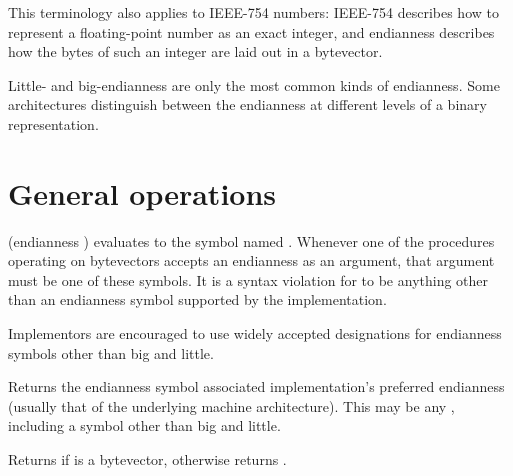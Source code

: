 This terminology also applies to IEEE-754 numbers: IEEE-754 describes
how to represent a floating-point number as an exact integer, and
endianness describes how the bytes of such an integer are laid out in
a bytevector.

\begin{note}
  Little- and big-endianness are only the most common kinds of
  endianness.  Some architectures distinguish between the endianness
  at different levels of a binary representation.
\end{note}

\section{General operations}

\begin{entry}{%
}

  {\cf (endianness )} evaluates to
the symbol named .  Whenever one of the
procedures operating on bytevectors accepts an endianness as an
argument, that argument must be one of these symbols.  It is a syntax
violation for  to be anything other than an
endianness symbol supported by the implementation.

\begin{note}
  Implementors are encouraged to use widely accepted designations
  for endianness symbols other than {\cf big} and {\cf little}.
\end{note}
\end{entry}

\begin{entry}{%
}

Returns the endianness symbol associated implementation's preferred
endianness (usually that of the underlying machine architecture).
This may be any , including a symbol other
than {\cf big} and {\cf little}.
\end{entry}   

\begin{entry}{%
}
   
Returns \schtrue{} if  is a bytevector,
otherwise returns \schfalse{}.
\end{entry}

